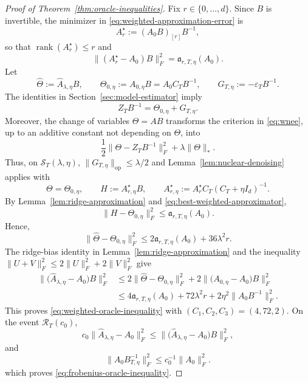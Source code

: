 \documentclass[11pt]{article}
\begin{document}
\begin{proof}[Proof of Theorem~\ref{thm:oracle-inequalities}]
Fix $r\in\{0,\ldots,d\}$. Since $B$ is invertible, the minimizer in
\eqref{eq:weighted-approximation-error} is
\[
    A_r^\star:=(A_0B)_{[r]}B^{-1},
\]
so that $\operatorname{rank}(A_r^\star)\leq r$ and
\begin{equation}
    \big\|(A_r^\star-A_0)B\big\|_F^2
    =\mathfrak a_{r,T,\eta}(A_0).
\label{eq:best-weighted-approximator}
\end{equation}
Let
\[
    \widehat\Theta:=\widehat A_{\lambda,\eta}B,
    \qquad
    \Theta_{0,\eta}:=A_{0,\eta}B=A_0C_TB^{-1},
    \qquad
    G_{T,\eta}:=-\varepsilon_TB^{-1}.
\]
The identities in Section~\ref{sec:model-estimator} imply
\[
    Z_TB^{-1}=\Theta_{0,\eta}+G_{T,\eta}.
\]
Moreover, the change of variables $\Theta=AB$ transforms the criterion in
\eqref{eq:wnee}, up to an additive constant not depending on $\Theta$, into
\[
    \frac12\big\|\Theta-Z_TB^{-1}\big\|_F^2+\lambda\|\Theta\|_*.
\]
Thus, on $\mathcal S_T(\lambda,\eta)$,
$\|G_{T,\eta}\|_{\mathrm{op}}\leq\lambda/2$ and
Lemma~\ref{lem:nuclear-denoising} applies with
\[
    \Theta=\Theta_{0,\eta},
    \qquad
    H:=A_{r,\eta}^\star B,
    \qquad
    A_{r,\eta}^\star:=A_r^\star C_T(C_T+\eta I_d)^{-1}.
\]
By Lemma~\ref{lem:ridge-approximation} and
\eqref{eq:best-weighted-approximator},
\[
    \big\|H-\Theta_{0,\eta}\big\|_F^2
    \leq\mathfrak a_{r,T,\eta}(A_0).
\]
Hence,
\begin{equation}
    \big\|\widehat\Theta-\Theta_{0,\eta}\big\|_F^2
    \leq
    2\mathfrak a_{r,T,\eta}(A_0)+36\lambda^2r.
\label{eq:oracle-ridge-target}
\end{equation}
The ridge-bias identity in Lemma~\ref{lem:ridge-approximation} and the inequality
$\|U+V\|_F^2\leq2\|U\|_F^2+2\|V\|_F^2$ give
\begin{align*}
    \big\|\big(\widehat A_{\lambda,\eta}-A_0\big)B\big\|_F^2
    &\leq
    2\big\|\widehat\Theta-\Theta_{0,\eta}\big\|_F^2
    +2\big\|\big(A_{0,\eta}-A_0\big)B\big\|_F^2 \\
    &\leq
    4\mathfrak a_{r,T,\eta}(A_0)
    +72\lambda^2r
    +2\eta^2\big\|A_0B^{-1}\big\|_F^2.
\end{align*}
This proves \eqref{eq:weighted-oracle-inequality} with
$(C_1,C_2,C_3)=(4,72,2)$. On the event $\mathcal R_T(c_0)$,
\[
    c_0\big\|\widehat A_{\lambda,\eta}-A_0\big\|_F^2
    \leq
    \big\|\big(\widehat A_{\lambda,\eta}-A_0\big)B\big\|_F^2,
\]
and 
\[
\|A_0B_{T,\eta}^{-1}\|_F^2
\le c_0^{-1}\|A_0\|_F^2.
\]
which proves \eqref{eq:frobenius-oracle-inequality}.
\end{proof}
\end{document}
